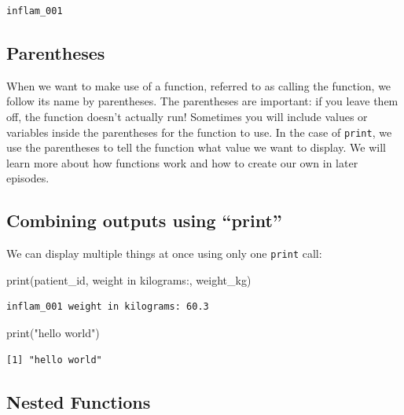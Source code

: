 \documentclass[
  letterpaper,
  DIV=11,
  numbers=noendperiod]{scrartcl}
\newenvironment{Shaded}{\begin{snugshade}}{\end{snugshade}}
\newcommand{\BuiltInTok}[1]{\textcolor[rgb]{0.00,0.23,0.31}{#1}}
\newcommand{\FunctionTok}[1]{\textcolor[rgb]{0.28,0.35,0.67}{#1}}
\newcommand{\NormalTok}[1]{\textcolor[rgb]{0.00,0.23,0.31}{#1}}
\newcommand{\StringTok}[1]{\textcolor[rgb]{0.13,0.47,0.30}{#1}}
\begin{document}
\begin{verbatim}
inflam_001
\end{verbatim}

\subsection{Parentheses}\label{parentheses}

When we want to make use of a function, referred to as calling the
function, we follow its name by parentheses. The parentheses are
important: if you leave them off, the function doesn't actually run!
Sometimes you will include values or variables inside the parentheses
for the function to use. In the case of \texttt{print}, we use the
parentheses to tell the function what value we want to display. We will
learn more about how functions work and how to create our own in later
episodes.

\subsection{Combining outputs using
``print''}\label{combining-outputs-using-print}

We can display multiple things at once using only one \texttt{print}
call:

\begin{Shaded}
\begin{Highlighting}[]
\BuiltInTok{print}\NormalTok{(patient\_id, }\StringTok{\textquotesingle{}weight in kilograms:\textquotesingle{}}\NormalTok{, weight\_kg)}
\end{Highlighting}
\end{Shaded}

\begin{verbatim}
inflam_001 weight in kilograms: 60.3
\end{verbatim}

\begin{Shaded}
\begin{Highlighting}[]
\FunctionTok{print}\NormalTok{(}\StringTok{"hello world"}\NormalTok{)}
\end{Highlighting}
\end{Shaded}

\begin{verbatim}
[1] "hello world"
\end{verbatim}

\subsection{Nested Functions}\label{nested-functions}
\end{document}
